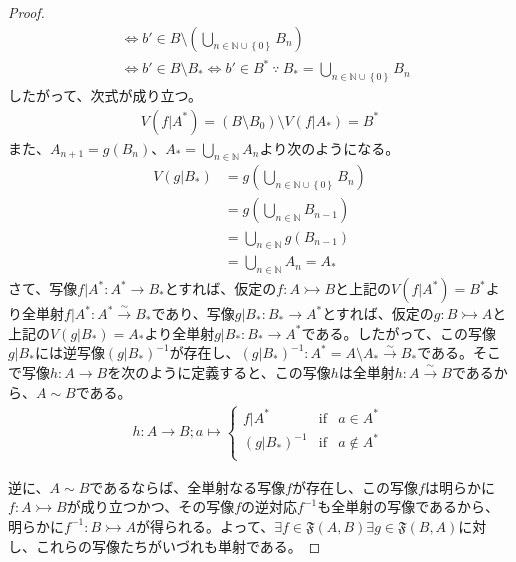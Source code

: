 \documentclass[dvipdfmx]{jsarticle}
\begin{document}
\begin{proof}
\begin{align*}
&\Leftrightarrow b' \in B \setminus \left( \bigcup_{n \in \mathbb{N} \cup \left\{ 0 \right\}} B_{n} \right)\\
&\Leftrightarrow b' \in B \setminus B_{*} \Leftrightarrow b' \in B^{*}\ \because\ B_{*} = \bigcup_{n \in \mathbb{N} \cup \left\{ 0 \right\}} B_{n}
\end{align*}
したがって、次式が成り立つ。
\begin{align*}
V\left( f|A^{*} \right) = \left( B \setminus B_{0} \right) \setminus V\left( f|A_{*} \right) = B^{*}
\end{align*}
また、$A_{n + 1} = g\left( B_{n} \right)$、$A_{*} = \bigcup_{n \in \mathbb{N}} A_{n}$より次のようになる。
\begin{align*}
V\left( g|B_{*} \right) &= g\left( \bigcup_{n \in \mathbb{N} \cup \left\{ 0 \right\}} B_{n} \right) \\
&= g\left( \bigcup_{n \in \mathbb{N}} B_{n - 1} \right) \\
&= \bigcup_{n \in \mathbb{N}} {g\left( B_{n - 1} \right)} \\
&= \bigcup_{n \in \mathbb{N}} A_{n} = A_{*}
\end{align*}
さて、写像$f|A^{*}:A^{*} \rightarrow B_{*}$とすれば、仮定の$f:A \rightarrowtail B$と上記の$V\left( f|A^{*} \right) = B^{*}$より全単射$f|A^{*}:A^{*}\overset{\sim}{\rightarrow}B_{*}$であり、写像$g|B_{*}:B_{*} \rightarrow A^{*}$とすれば、仮定の$g:B \rightarrowtail A$と上記の$V\left( g|B_{*} \right) = A_{*}$より全単射$g|B_{*}:B_{*} \rightarrow A^{*}$である。したがって、この写像$g|B_{*}$には逆写像$\left( g|B_{*} \right)^{- 1}$が存在し、$\left( g|B_{*} \right)^{- 1}:A^{*} = A \setminus A_{*}\overset{\sim}{\rightarrow}B_{*}$である。そこで写像$h:A \rightarrow B$を次のように定義すると、この写像$h$は全単射$h:A\overset{\sim}{\rightarrow}B$であるから、$A \sim B$である。
\begin{align*}
h:A \rightarrow B;a \mapsto \left\{ \begin{matrix}
f|A^{*} & {\mathrm {if}} & a \in A^{*} \\
\left( g|B_{*} \right)^{- 1} & {\mathrm {if}} & a \notin A^{*} \\
\end{matrix} \right.\ 
\end{align*}\par
逆に、$A \sim B$であるならば、全単射なる写像$f$が存在し、この写像$f$は明らかに$f:A \rightarrowtail B$が成り立つかつ、その写像$f$の逆対応$f^{- 1}$も全単射の写像であるから、明らかに$f^{- 1}:B \rightarrowtail A$が得られる。よって、$\exists f \in \mathfrak{F}(A,B)\exists g \in \mathfrak{F}(B,A)$に対し、これらの写像たちがいづれも単射である。
\end{proof}
\end{document}
